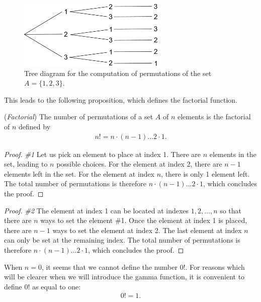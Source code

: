 \begin{figure}
\begin{center}
\includegraphics[width=7cm]{introdiscreteprobas/tree-permutation.pdf}
\end{center}
\caption{Tree diagram for the computation of permutations of the set $A=\{1,2,3\}$.}
\label{fig-introstats-treediag-permutation}
\end{figure}

This leads to the following proposition, which defines 
the factorial function.

\begin{proposition}
(\emph{Factorial})
\label{propo-factorial}
The number of permutations of a set $A$ of $n$ elements is 
the factorial of $n$ defined by 
\begin{eqnarray}
n! = n \cdot  (n-1) \ldots 2\cdot  1. \label{propo-factorial1}
\end{eqnarray}
\end{proposition}

\begin{proof} \textit{\#1}
Let us pick an element to place at index 1. There are $n$ elements in the set, leading to 
$n$ possible choices. For the element at index 2, there are $n-1$ elements left in the set. 
For the element at index $n$, there is only 1 element left. The total number of permutations is 
therefore $n\cdot (n-1) \ldots 2\cdot 1$, which concludes the proof.
\end{proof}

\begin{proof} \textit{\#2}
The element at index 1 can be located at indexes $1, 2, \ldots, n$ so that there are 
$n$ ways to set the element \#1. Once the element at index 1 is placed, there are $n-1$ 
ways to set the element at index 2. The last element at index $n$ can only be set at the remaining
index. The total number of permutations is therefore $n\cdot (n-1) \ldots 2\cdot 1$,
which concludes the proof. 
\end{proof}

When $n=0$, it seems that we cannot define the number $0!$.
For reasons which will be clearer when we will introduce the gamma 
function, it is convenient to define $0!$ as equal to one:
\begin{eqnarray}
0! = 1.
\end{eqnarray}


